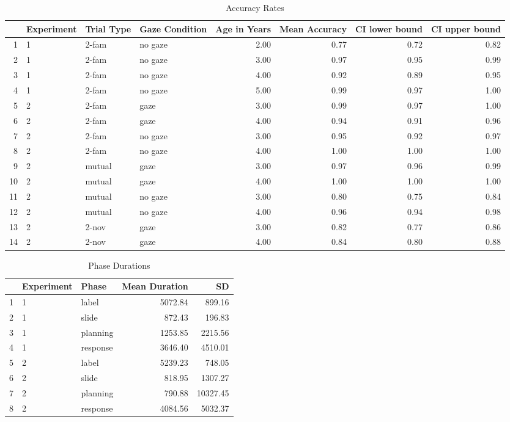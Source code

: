 \documentclass[a4paper,man,apacite,floatsintext]{apa6}
\begin{document}
\begin{table}[h]
\centering
\begin{tabular}{rlllrrrr}
  \hline
 & Experiment & Trial Type & Gaze Condition & Age in Years & Mean Accuracy & CI lower bound & CI upper bound \\ 
  \hline
1 & 1 & 2-fam & no gaze & 2.00 & 0.77 & 0.72 & 0.82 \\ 
  2 & 1 & 2-fam & no gaze & 3.00 & 0.97 & 0.95 & 0.99 \\ 
  3 & 1 & 2-fam & no gaze & 4.00 & 0.92 & 0.89 & 0.95 \\ 
  4 & 1 & 2-fam & no gaze & 5.00 & 0.99 & 0.97 & 1.00 \\ 
   \hline
5 & 2 & 2-fam & gaze & 3.00 & 0.99 & 0.97 & 1.00 \\ 
  6 & 2 & 2-fam & gaze & 4.00 & 0.94 & 0.91 & 0.96 \\ 
  7 & 2 & 2-fam & no gaze & 3.00 & 0.95 & 0.92 & 0.97 \\ 
  8 & 2 & 2-fam & no gaze & 4.00 & 1.00 & 1.00 & 1.00 \\ 
  9 & 2 & mutual & gaze & 3.00 & 0.97 & 0.96 & 0.99 \\ 
  10 & 2 & mutual & gaze & 4.00 & 1.00 & 1.00 & 1.00 \\ 
  11 & 2 & mutual & no gaze & 3.00 & 0.80 & 0.75 & 0.84 \\ 
  12 & 2 & mutual & no gaze & 4.00 & 0.96 & 0.94 & 0.98 \\ 
  13 & 2 & 2-nov & gaze & 3.00 & 0.82 & 0.77 & 0.86 \\ 
  14 & 2 & 2-nov & gaze & 4.00 & 0.84 & 0.80 & 0.88 \\ 
   \hline
\end{tabular}
\caption{Accuracy Rates} 
\label{tab:acc_table}
\end{table}

\begin{table}[h]
\centering
\begin{tabular}{rllrr}
  \hline
 & Experiment & Phase & Mean Duration & SD \\ 
  \hline
1 & 1 & label & 5072.84 & 899.16 \\ 
  2 & 1 & slide & 872.43 & 196.83 \\ 
  3 & 1 & planning & 1253.85 & 2215.56 \\ 
  4 & 1 & response & 3646.40 & 4510.01 \\ 
   \hline
5 & 2 & label & 5239.23 & 748.05 \\ 
  6 & 2 & slide & 818.95 & 1307.27 \\ 
  7 & 2 & planning & 790.88 & 10327.45 \\ 
  8 & 2 & response & 4084.56 & 5032.37 \\ 
   \hline
\end{tabular}
\caption{Phase Durations} 
\label{tab:phases}
\end{table}
\end{document}

